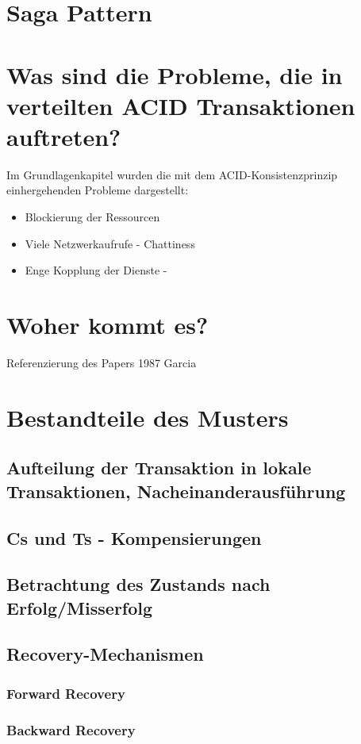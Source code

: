 \section{Saga Pattern}

\section{Was sind die Probleme, die in verteilten ACID Transaktionen auftreten?}
Im Grundlagenkapitel wurden die mit dem ACID-Konsistenzprinzip einhergehenden Probleme dargestellt:
\begin{itemize}
	\item Blockierung der Ressourcen
	\item Viele Netzwerkaufrufe - Chattiness
	\item Enge Kopplung der Dienste - 
\end{itemize}
\section{Woher kommt es?}
Referenzierung des Papers 1987 Garcia

\section{Bestandteile des Musters}
\subsection{Aufteilung der Transaktion in lokale Transaktionen, Nacheinanderausführung}

\subsection{Cs und Ts - Kompensierungen}

\subsection{Betrachtung des Zustands nach Erfolg/Misserfolg}

\subsection{Recovery-Mechanismen}
\subsubsection{Forward Recovery}
\subsubsection{Backward Recovery}
